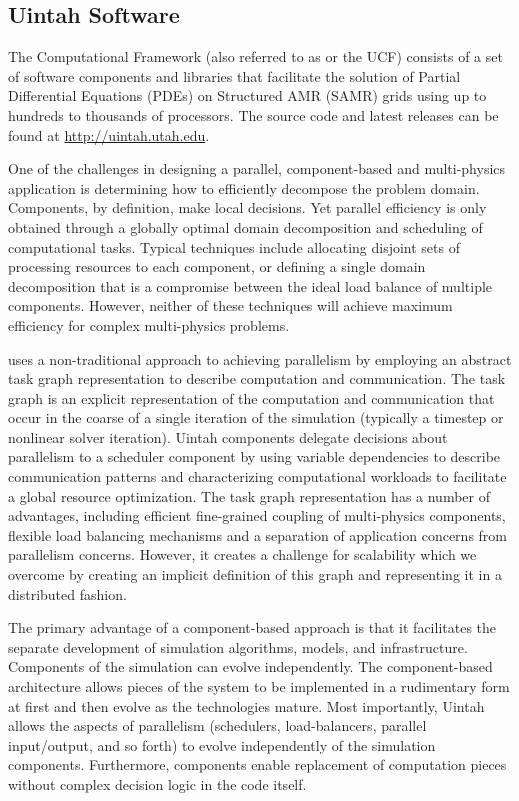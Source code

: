 \subsection{Uintah Software}
The \Uintah Computational Framework (also referred to as \Uintah or the UCF)
consists of a set of software components and libraries that facilitate
the solution of Partial Differential Equations (PDEs) on Structured
AMR (SAMR) grids using up to hundreds to thousands of processors.
The source code and latest releases can be found at 
\url{http://uintah.utah.edu}.

One of the challenges in designing a parallel, component-based and
multi-physics application is determining how to efficiently decompose
the problem domain. Components, by definition, make local
decisions. Yet parallel efficiency is only obtained through a globally
optimal domain decomposition and scheduling of computational
tasks. Typical techniques include allocating disjoint sets of
processing resources to each component, or defining a single domain
decomposition that is a compromise between the ideal load balance of
multiple components. However, neither of these techniques will achieve
maximum efficiency for complex multi-physics problems.

\Uintah uses a non-traditional approach to achieving parallelism by
employing an abstract task graph representation to describe
computation and communication. The task graph is an explicit
representation of the computation and communication that occur in the
coarse of a single iteration of the simulation (typically a timestep
or nonlinear solver iteration). Uintah components delegate decisions
about parallelism to a scheduler component by using variable
dependencies to describe communication patterns and characterizing
computational workloads to facilitate a global resource
optimization. The task graph representation has a number of
advantages, including efficient fine-grained coupling of multi-physics
components, flexible load balancing mechanisms and a separation of
application concerns from parallelism concerns. However, it creates a
challenge for scalability which we overcome by creating an implicit
definition of this graph and representing it in a distributed fashion.

The primary advantage of a component-based approach is that it
facilitates the separate development of simulation algorithms, models,
and infrastructure. Components of the simulation can evolve
independently. The component-based architecture allows pieces of the
system to be implemented in a rudimentary form at first and then
evolve as the technologies mature. Most importantly, Uintah allows the
aspects of parallelism (schedulers, load-balancers, parallel
input/output, and so forth) to evolve independently of the simulation
components. Furthermore, components enable replacement of computation
pieces without complex decision logic in the code itself.

